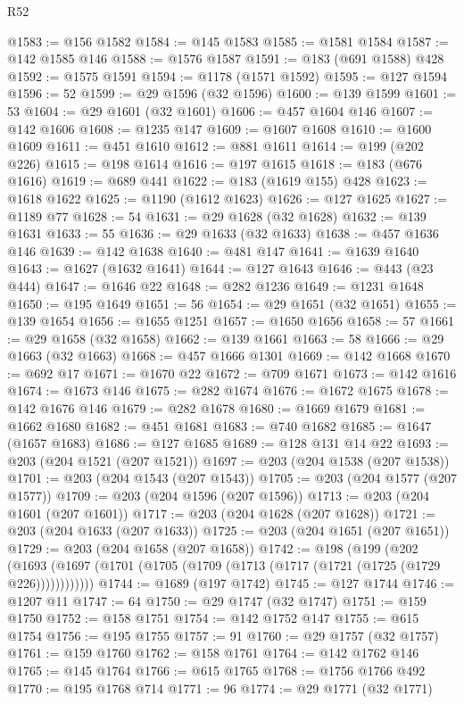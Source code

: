 \begin{lexlean}{R52}
\begin{coremodule}
@1583 := @156 @1582
@1584 := @145 @1583
@1585 := @1581 @1584
@1587 := @142 @1585 @146
@1588 := @1576 @1587
@1591 := @183 (@691 @1588) @428
@1592 := @1575 @1591
@1594 := @1178 (@1571 @1592)
@1595 := @127 @1594
@1596 := 52
@1599 := @29 @1596 (@32 @1596)
@1600 := @139 @1599
@1601 := 53
@1604 := @29 @1601 (@32 @1601)
@1606 := @457 @1604 @146
@1607 := @142 @1606
@1608 := @1235 @147
@1609 := @1607 @1608
@1610 := @1600 @1609
@1611 := @451 @1610
@1612 := @881 @1611
@1614 := @199 (@202 @226)
@1615 := @198 @1614
@1616 := @197 @1615
@1618 := @183 (@676 @1616)
@1619 := @689 @441
@1622 := @183 (@1619 @155) @428
@1623 := @1618 @1622
@1625 := @1190 (@1612 @1623)
@1626 := @127 @1625
@1627 := @1189 @77
@1628 := 54
@1631 := @29 @1628 (@32 @1628)
@1632 := @139 @1631
@1633 := 55
@1636 := @29 @1633 (@32 @1633)
@1638 := @457 @1636 @146
@1639 := @142 @1638
@1640 := @481 @147
@1641 := @1639 @1640
@1643 := @1627 (@1632 @1641)
@1644 := @127 @1643
@1646 := @443 (@23 @444)
@1647 := @1646 @22
@1648 := @282 @1236
@1649 := @1231 @1648
@1650 := @195 @1649
@1651 := 56
@1654 := @29 @1651 (@32 @1651)
@1655 := @139 @1654
@1656 := @1655 @1251
@1657 := @1650 @1656
@1658 := 57
@1661 := @29 @1658 (@32 @1658)
@1662 := @139 @1661
@1663 := 58
@1666 := @29 @1663 (@32 @1663)
@1668 := @457 @1666 @1301
@1669 := @142 @1668
@1670 := @692 @17
@1671 := @1670 @22
@1672 := @709 @1671
@1673 := @142 @1616
@1674 := @1673 @146
@1675 := @282 @1674
@1676 := @1672 @1675
@1678 := @142 @1676 @146
@1679 := @282 @1678
@1680 := @1669 @1679
@1681 := @1662 @1680
@1682 := @451 @1681
@1683 := @740 @1682
@1685 := @1647 (@1657 @1683)
@1686 := @127 @1685
@1689 := @128 @131 @14 @22
@1693 := @203 (@204 @1521 (@207 @1521))
@1697 := @203 (@204 @1538 (@207 @1538))
@1701 := @203 (@204 @1543 (@207 @1543))
@1705 := @203 (@204 @1577 (@207 @1577))
@1709 := @203 (@204 @1596 (@207 @1596))
@1713 := @203 (@204 @1601 (@207 @1601))
@1717 := @203 (@204 @1628 (@207 @1628))
@1721 := @203 (@204 @1633 (@207 @1633))
@1725 := @203 (@204 @1651 (@207 @1651))
@1729 := @203 (@204 @1658 (@207 @1658))
@1742 := @198
    (@199
      (@202 (@1693 (@1697 (@1701 (@1705 (@1709 (@1713 (@1717 (@1721 (@1725 (@1729 @226))))))))))))
@1744 := @1689 (@197 @1742)
@1745 := @127 @1744
@1746 := @1207 @11
@1747 := 64
@1750 := @29 @1747 (@32 @1747)
@1751 := @159 @1750
@1752 := @158 @1751
@1754 := @142 @1752 @147
@1755 := @615 @1754
@1756 := @195 @1755
@1757 := 91
@1760 := @29 @1757 (@32 @1757)
@1761 := @159 @1760
@1762 := @158 @1761
@1764 := @142 @1762 @146
@1765 := @145 @1764
@1766 := @615 @1765
@1768 := @1756 @1766 @492
@1770 := @195 @1768 @714
@1771 := 96
@1774 := @29 @1771 (@32 @1771)

\end{coremodule}
\end{lexlean}
